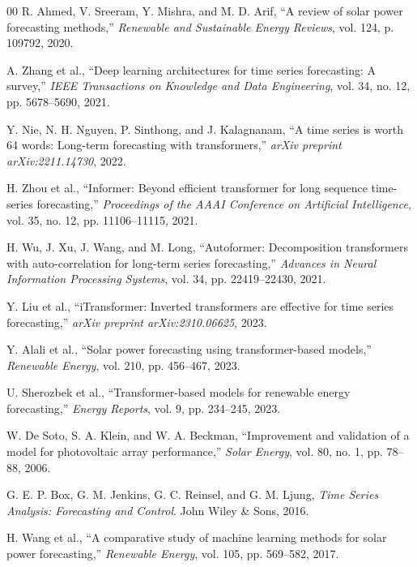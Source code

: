 \documentclass[conference]{IEEEtran}
\begin{document}
\begin{thebibliography}{00}
 R. Ahmed, V. Sreeram, Y. Mishra, and M. D. Arif, ``A review of solar power forecasting methods,'' \textit{Renewable and Sustainable Energy Reviews}, vol. 124, p. 109792, 2020.

 A. Zhang et al., ``Deep learning architectures for time series forecasting: A survey,'' \textit{IEEE Transactions on Knowledge and Data Engineering}, vol. 34, no. 12, pp. 5678--5690, 2021.

 Y. Nie, N. H. Nguyen, P. Sinthong, and J. Kalagnanam, ``A time series is worth 64 words: Long-term forecasting with transformers,'' \textit{arXiv preprint arXiv:2211.14730}, 2022.

 H. Zhou et al., ``Informer: Beyond efficient transformer for long sequence time-series forecasting,'' \textit{Proceedings of the AAAI Conference on Artificial Intelligence}, vol. 35, no. 12, pp. 11106--11115, 2021.

 H. Wu, J. Xu, J. Wang, and M. Long, ``Autoformer: Decomposition transformers with auto-correlation for long-term series forecasting,'' \textit{Advances in Neural Information Processing Systems}, vol. 34, pp. 22419--22430, 2021.

 Y. Liu et al., ``iTransformer: Inverted transformers are effective for time series forecasting,'' \textit{arXiv preprint arXiv:2310.06625}, 2023.

 Y. Alali et al., ``Solar power forecasting using transformer-based models,'' \textit{Renewable Energy}, vol. 210, pp. 456--467, 2023.

 U. Sherozbek et al., ``Transformer-based models for renewable energy forecasting,'' \textit{Energy Reports}, vol. 9, pp. 234--245, 2023.

 W. De Soto, S. A. Klein, and W. A. Beckman, ``Improvement and validation of a model for photovoltaic array performance,'' \textit{Solar Energy}, vol. 80, no. 1, pp. 78--88, 2006.

 G. E. P. Box, G. M. Jenkins, G. C. Reinsel, and G. M. Ljung, \textit{Time Series Analysis: Forecasting and Control}. John Wiley \& Sons, 2016.

 H. Wang et al., ``A comparative study of machine learning methods for solar power forecasting,'' \textit{Renewable Energy}, vol. 105, pp. 569--582, 2017.


\end{thebibliography}
\end{document}
